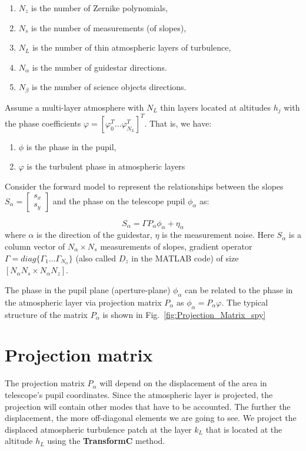 \documentclass[a4paper,12pt]{article}
\begin{document}
\begin{enumerate}
 \item  $N_z$ is the number of Zernike polynomials,
 \item  $N_s$ is the number of measurements (of slopes), 
 \item $N_L$ is the number of thin atmospheric layers of turbulence, 
 \item $N_\alpha$ is the number of guidestar directions. 
 \item $N_\beta$ is the number of science objects directions. 
\end{enumerate}

Assume a multi-layer atmosphere with $N_L$ thin layers located at altitudes $h_j$ with the phase coefficients $\varphi = [\varphi_0^T \dots \varphi_{N_L}^T ]^T$.  That is, we have:

\begin{enumerate}
 \item  $\phi$ is the phase in the pupil,
 \item  $\varphi$ is the turbulent phase in atmospheric layers
\end{enumerate}

Consider the forward model to represent the relationships between the slopes $S_\alpha = \left[ \begin{array}{c} s_x \\ s_y \end{array} \right]$ and the phase on the telescope pupil $\phi_\alpha$ as:

\begin{equation}
 S_\alpha =  \Gamma  P_\alpha \phi_\alpha + \eta_\alpha
\end{equation}
where $\alpha$ is the direction of the guidestar, $\eta$ is the measurement noise. Here $S_\alpha$ is a column vector of $N_\alpha \times N_s$ measurements of slopes, gradient operator $\Gamma = diag \{ \Gamma_1 \dots \Gamma_{N_\alpha} \}$ (also called $D_z$ in the MATLAB code) of size $[N_\alpha N_s \times N_\alpha N_z ]$.

The phase in the pupil plane (aperture-plane) $\phi_\alpha$ can be related to the phase in the atmospheric layer via projection matrix $P_\alpha$ as $\phi_\alpha =P_\alpha \varphi $. The typical structure of the matrix $P_\alpha $ is shown in Fig.~\ref{fig:Projection_Matrix_spy}



\section{Projection matrix}
The projection matrix $P_\alpha$ will depend on the displacement of the area in telescope's pupil coordinates. Since the atmospheric layer is projected, the projection will contain other modes that have to be accounted. The further the displacement, the more off-diagonal elements we are going to see. We project the displaced atmospheric turbulence patch at the layer $k_L$ that is located at the altitude $h_L$ using the \textbf{TransformC} method.
\end{document}
